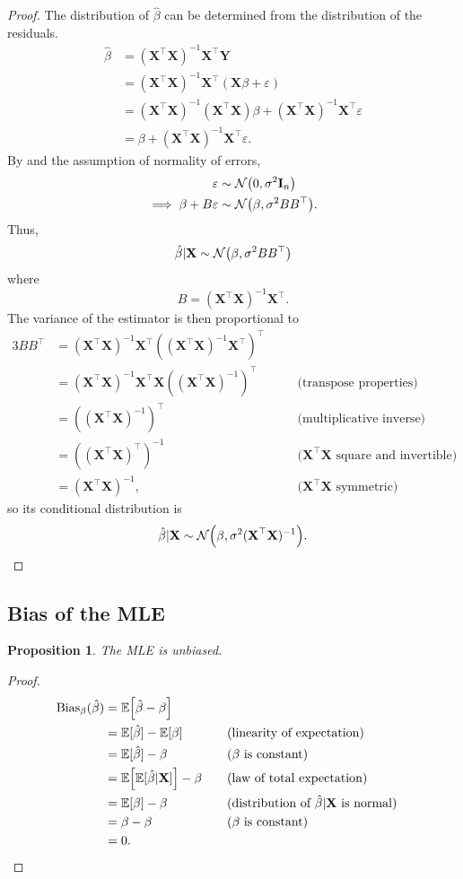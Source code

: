 \documentclass[letterpaper, reqno]{amsart}
\newtheorem{prop}{Proposition}[section]
\numberwithin{equation}{section}
\newcommand{\T}{\top} %
\newcommand{\vect}[1]{\boldsymbol{\mathbf{#1}}} %
\newcommand{\E}[1]{\mathbb{E}\mleft[#1\mright]}
\newcommand{\N}[2]{\mathcal{N}\mleft( #1, #2 \mright)}
\newcommand{\by}[1]{&\quad&\text{(#1)}}
\newcommand{\Xm}{\vect{X}}
\newcommand{\Yv}{\vect{Y}}
\newcommand{\Bv}{\beta}
\newcommand{\Bvh}{\hat{\beta}}
\newcommand{\ve}{\varepsilon}
\newcommand{\Ebh}{\mathbb{E}[\Bvh]}
\begin{document}
\begin{proof}
  The distribution of $\Bvh$ can be determined from the distribution of the
  residuals.
  \begin{align*}
    \Bvh &= (\Xm^\T \Xm)^{-1} \Xm^\T \Yv \\
        &= (\Xm^\T \Xm)^{-1} \Xm^\T (\Xm \Bv + \ve) \\
        &= (\Xm^\T \Xm)^{-1} (\Xm^\T \Xm) \Bv 
          + (\Xm^\T \Xm)^{-1} \Xm^\T \ve \\
        &= \Bv + (\Xm^\T \Xm)^{-1} \Xm^\T \ve.
  \end{align*}
  By  and the assumption of normality of errors,
  \begin{align*}
    \ve &\sim \N{0}{\sigma^2 \vect{I}_n} \\
    \implies \Bv + B\ve &\sim \N{\Bv}{\sigma^2 B B^\T}.
  \end{align*}
  Thus,
    \[ \Bvh|\Xm \sim \N{\Bv}{\sigma^2 B B^\T} \]
  where
  \[ B = (\Xm^\T \Xm)^{-1} \Xm^\T. \]
  The variance of the estimator is then proportional to
  \begin{alignat*}{3}
    B B^\T &= (\Xm^\T \Xm)^{-1} \Xm^\T ((\Xm^\T \Xm)^{-1} \Xm^\T)^\T  \\
          &= (\Xm^\T \Xm)^{-1} \Xm^\T \Xm ((\Xm^\T \Xm)^{-1})^\T  \by{transpose properties} \\
          &= ((\Xm^\T \Xm)^{-1})^\T \by{multiplicative inverse} \\
          &= ((\Xm^\T \Xm)^\T)^{-1} \by{$\Xm^\T\Xm$ square and invertible} \\
          &= (\Xm^\T \Xm)^{-1}, \by{$\Xm^\T\Xm$ symmetric}
  \end{alignat*}
  so its conditional distribution is
  \[ \Bvh|\Xm \sim \N{\Bv}{ \sigma^2 (\Xm^\T \Xm)^{-1}}. \qedhere \]
\end{proof}

\subsection{Bias of the MLE}
\begin{prop}
  The MLE is unbiased.
\end{prop}

\begin{proof}
  \begin{alignat*}{3}
    \mathrm{Bias}_\Bv(\Bvh) &= \E{\Bvh - \Bv} \\
    &= \Ebh - \E{\Bv} \by{linearity of expectation} \\
    &= \Ebh - \Bv \by{$\Bv$ is constant} \\
    &= \E{\mathbb{E}[\Bvh|\Xm]} - \Bv \by{law of total expectation} \\
    &= \E{\Bv} - \Bv \by{distribution of $\Bvh|\Xm$ is normal} \\
    &= \Bv - \Bv \by{$\Bv$ is constant} \\
    &= 0. \tag*{\qedhere}
  \end{alignat*}
\end{proof}
\end{document}
